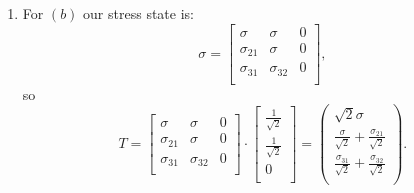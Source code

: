 \begin{derivation}
\begin{enumerate}[label=(\alph*)]
    \item For $(b)$ our stress state is:
      \begin{equation*}
        \sigma = \begin{bmatrix}
          \sigma & \sigma & 0\\
        \sigma_{21} & \sigma & 0\\
        \sigma_{31} & \sigma_{32} & 0\\
        \end{bmatrix}
      ,\end{equation*}
      so
      \begin{equation*}
        T = \begin{bmatrix}
          \sigma & \sigma & 0\\
        \sigma_{21} & \sigma & 0\\
        \sigma_{31} & \sigma_{32} & 0\\
        \end{bmatrix} \cdot \begin{bmatrix}
          \frac{1}{\sqrt{2}}\\
        \frac{1}{\sqrt{2}}\\
        0\\
        \end{bmatrix} = \left(
\begin{array}{c}
 \sqrt{2} \sigma  \\
 \frac{\sigma }{\sqrt{2}}+\frac{\sigma _{21}}{\sqrt{2}} \\
 \frac{\sigma _{31}}{\sqrt{2}}+\frac{\sigma _{32}}{\sqrt{2}} \\
\end{array}
\right)
      .\end{equation*}
  \end{enumerate}
\end{derivation}


